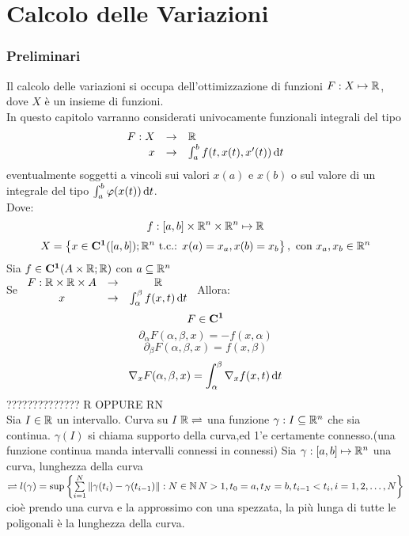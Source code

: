 \part{Calcolo delle Variazioni}

\section{Preliminari}
Il calcolo delle variazioni si occupa dell'ottimizzazione di funzioni $ F : X \mapsto \mathbb{R} $, dove $X$ è un insieme di funzioni.\\
In questo capitolo varranno considerati univocamente funzionali integrali del tipo
$$\begin{array}{rcl} F: X & \to & \mathbb{R} \\
x & \to & \int_{a}^b f(t,x(t), x'(t))\,\mathrm{d}{t}\end{array}$$
eventualmente soggetti a vincoli sui valori $x(a)$ e $x(b)$ o sul valore di un integrale del tipo $\int_a^b \varphi(x(t))\,\mathrm{d}{t}$.\\
Dove:
$$f: \left[a,b\right]\times \mathbb{R} ^n\times \mathbb{R} ^n \mapsto \mathbb{R}$$
$$X=\left\{x\in \mathbf{C^{1}}(\left[a,b\right]); \mathbb{R} ^n\text{ t.c.: }x(a)=x_a, x(b)=x_b \right\},\text{ con }x_a,x_b\in \mathbb{R} ^n$$
\proposition
Sia $f\in \mathbf{C^{1}}(A\times \mathbb{R} ; \mathbb{R} )$ con $a\subseteq \mathbb{R} ^n$\\
Se $\begin{array}{ccc} F: \mathbb{R} \times \mathbb{R} \times A & \to & \mathbb{R} \\
x & \to & \int_{\alpha}^\beta f(x,t)\,\mathrm{d}{t}\end{array}$
Allora:
$$ F\in \mathbf{C^{1}}$$
$$ \partial_\alpha F(\alpha,\beta,x)=-f(x,\alpha)$$
$$ \partial_\beta F(\alpha,\beta,x)=f(x,\beta)$$
$$ \nabla_x F(\alpha,\beta,x)=\int_{\alpha}^{\beta}\nabla_xf(x,t)\,\mathrm{d}{t}$$
 ?????????????? R OPPURE RN\\
Sia $I\in \mathbb{R} $ un intervallo. Curva su $I$ $ \mathbb{R} \rightleftharpoons$ una funzione $\gamma:I\subseteq \mathbb{R} ^n$ che sia continua.
\observation
$\gamma(I)$ si chiama supporto della curva,ed 1'e certamente connesso.(una funzione continua manda intervalli connessi in connessi)
Sia $\gamma : \left[a,b\right] \mapsto \mathbb{R}^n$ una curva, lunghezza della curva $\rightleftharpoons l(\gamma)=\sup\left\{\sum\limits_{i=1}^{N}\left\|\gamma(t_i)-\gamma(t_{i-1})\right\|: N\in\mathbb{N}\,N>1,t_0=a,t_N=b,t_{i-1}<t_i, i=1,2,\ldots,N \right\}$ 
cioè prendo una curva e la approssimo con una spezzata, la più lunga di tutte le poligonali è la lunghezza della curva.\\
